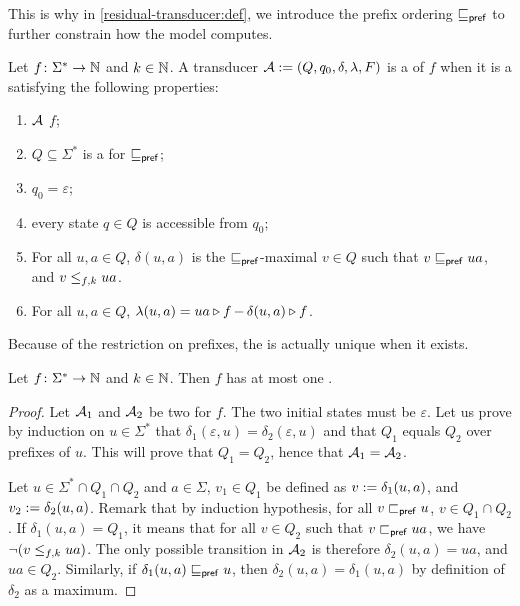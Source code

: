 This is why in \cref{residual-transducer:def}, we introduce the prefix ordering
$\prefleq$ to further constrain how the model computes.

\begin{definition}
    \label{residual-transducer:def}
    Let $f \colon \Sigma^* \to \Nat$ and $k \in \Nat$.
    A transducer $\aTransd \defined (Q, q_0, \delta, \lambda, F)$
    is a 
    of $f$ 
    when
    it is a 
    satisfying the following properties:
    \begin{enumerate}
        \item $\aTransd$  $f$;
        \item $Q \subseteq \Sigma^*$ is a 
            for $\prefleq$;
        \item $q_0 = \varepsilon$;
        \item every state $q \in Q$ is accessible from $q_0$;
        \item For all $u, a \in Q$,
            $\delta(u,a)$ is the $\prefleq$-maximal $v \in Q$
            such that $v \prefleq ua$, and $v \resleq{f}{k} ua$.
        \item For all $u,a \in Q$,
            $\lambda(u,a) = \app{f}{ua} - \app{f}{\delta(u,a)}$.
    \end{enumerate}
\end{definition}

Because of the restriction on prefixes, the 
is actually unique when it exists.

\begin{fact}
    \label{unique-res-transducer:fact}
    Let $f \colon \Sigma^* \to \Nat$ and $k \in \Nat$.
    Then $f$ has at most one .
\end{fact}
\begin{proof}
    Let $\aTransd_1$ and $\aTransd_2$ be two
     for $f$.
    The two initial states must be $\varepsilon$.
    Let us prove by induction on $u \in \Sigma^*$ that
    $\delta_1(\varepsilon, u) = \delta_2(\varepsilon, u)$
    and that $Q_1$ equals $Q_2$ over prefixes of $u$.
    This will prove that 
    $Q_1 = Q_2$, hence that $\aTransd_1 = \aTransd_2$.

    Let $u \in \Sigma^* \cap Q_1 \cap Q_2$ and $a \in \Sigma$, $v_1 \in Q_1$ be
    defined as $v \defined \delta_1(u,a)$, and $v_2 \defined \delta_2(u,a)$.
    Remark that by induction hypothesis, for all $v \prefle u$, $v \in Q_1 \cap
    Q_2$. If $\delta_1(u,a) = Q_1$, it means that for all $v \in Q_2$ such that
    $v \prefle ua$, we have $\neg( v \resleq{f}{k} ua )$. The only possible
    transition in $\aTransd_2$ is therefore $\delta_2(u,a) = ua$, and $ua \in
    Q_2$. Similarly, if $\delta_1(u,a) \prefleq u$, then $\delta_2(u,a) =
    \delta_1(u,a)$ by definition of $\delta_2$ as a maximum.
\end{proof}

